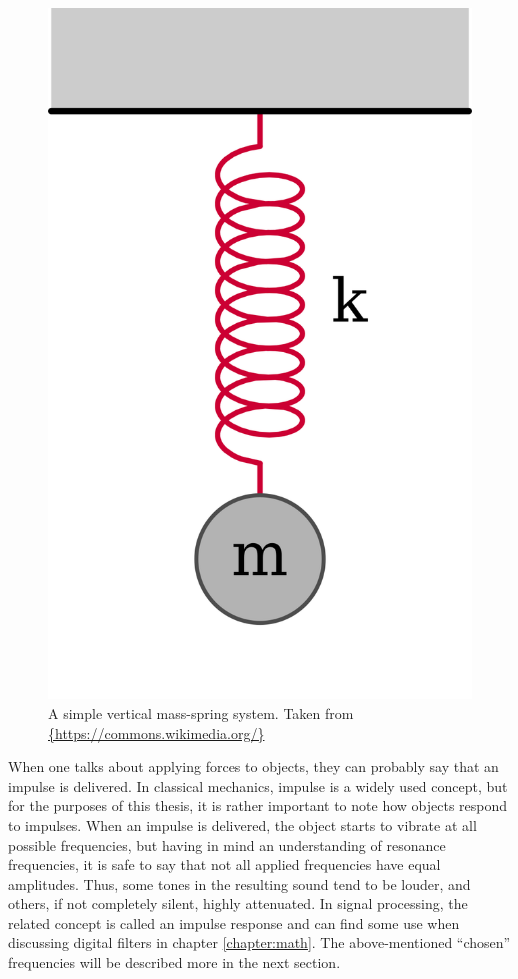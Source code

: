 \begin{figure}[h]
	\centering
	\includegraphics[height=0.3\textheight]{include/vertical_mass_spring}
	\caption{A simple vertical mass-spring system. Taken from \url{{https://commons.wikimedia.org/}}}
	\label{img:vertical_mass_spring}
\end{figure}

When one talks about applying forces to objects, they can probably say that an impulse is delivered. In classical mechanics, impulse is a widely used concept, but for the purposes of this thesis, it is rather important to note how objects respond to impulses. When an impulse is delivered, the object starts to vibrate at all possible frequencies, but having in mind an understanding of resonance frequencies, it is safe to say that not all applied frequencies have equal amplitudes. Thus, some tones in the resulting sound tend to be louder, and others, if not completely silent, highly attenuated. In signal processing, the related concept is called an impulse response and can find some use when discussing digital filters in chapter \ref{chapter:math}. The above-mentioned “chosen” frequencies will be described more in the next section.\\

